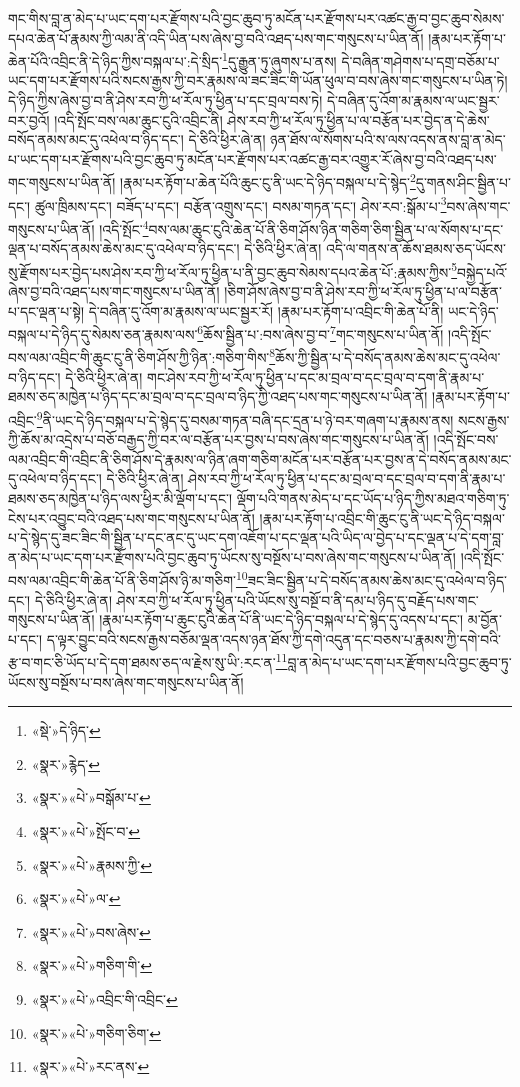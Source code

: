 གང་གིས་བླ་ན་མེད་པ་ཡང་དག་པར་རྫོགས་པའི་བྱང་ཆུབ་ཏུ་མངོན་པར་རྫོགས་པར་འཚང་རྒྱ་བ་བྱང་ཆུབ་སེམས་དཔའ་ཆེན་པོ་རྣམས་ཀྱི་ལམ་ནི་འདི་ཡིན་པས་ཞེས་བྱ་བའི་འཐད་པས་གང་གསུངས་པ་ཡིན་ནོ། །རྣམ་པར་རྟོག་པ་ཆེན་པོའི་འབྲིང་ནི་དེ་ཉིད་ཀྱིས་བསྐལ་པ་:དེ་སྲིད་\footnote{«སྡེ་»དེ་ཉིད་}དུ་རྒྱུན་ཏུ་ཞུགས་པ་ནས། དེ་བཞིན་གཤེགས་པ་དགྲ་བཅོམ་པ་ཡང་དག་པར་རྫོགས་པའི་སངས་རྒྱས་ཀྱི་བར་རྣམས་ལ་ཟང་ཟིང་གི་ཡོན་ཕུལ་བ་བས་ཞེས་གང་གསུངས་པ་ཡིན་ཏེ། དེ་ཉིད་ཀྱིས་ཞེས་བྱ་བ་ནི་ཤེས་རབ་ཀྱི་ཕ་རོལ་ཏུ་ཕྱིན་པ་དང་བྲལ་བས་ཏེ། དེ་བཞིན་དུ་འོག་མ་རྣམས་ལ་ཡང་སྦྱར་བར་བྱའོ། །འདི་སྤོང་བས་ལམ་ཆུང་ངུའི་འབྲིང་ནི། ཤེས་རབ་ཀྱི་ཕ་རོལ་ཏུ་ཕྱིན་པ་ལ་བརྩོན་པར་བྱེད་ན་དེ་ཆེས་བསོད་ནམས་མང་དུ་འཕེལ་བ་ཉིད་དང་། དེ་ཅིའི་ཕྱིར་ཞེ་ན། ཉན་ཐོས་ལ་སོགས་པའི་ས་ལས་འདས་ནས་བླ་ན་མེད་པ་ཡང་དག་པར་རྫོགས་པའི་བྱང་ཆུབ་ཏུ་མངོན་པར་རྫོགས་པར་འཚང་རྒྱ་བར་འགྱུར་རོ་ཞེས་བྱ་བའི་འཐད་པས་གང་གསུངས་པ་ཡིན་ནོ། །རྣམ་པར་རྟོག་པ་ཆེན་པོའི་ཆུང་ངུ་ནི་ཡང་དེ་ཉིད་བསྐལ་པ་དེ་སྙེད་\footnote{«སྣར་»རྙེད་}དུ་གནས་ཤིང་སྦྱིན་པ་དང་། ཚུལ་ཁྲིམས་དང་། བཟོད་པ་དང་། བརྩོན་འགྲུས་དང་། བསམ་གཏན་དང་། ཤེས་རབ་:སྒོམ་པ་\footnote{«སྣར་»«པེ་»བསྒོམ་པ་}བས་ཞེས་གང་གསུངས་པ་ཡིན་ནོ། །འདི་སྤོང་\footnote{«སྣར་»«པེ་»སྤོང་བ་}བས་ལམ་ཆུང་ངུའི་ཆེན་པོ་ནི་ཅིག་ཤོས་ཉིན་གཅིག་ཅིག་སྦྱིན་པ་ལ་སོགས་པ་དང་ལྡན་པ་བསོད་ནམས་ཆེས་མང་དུ་འཕེལ་བ་ཉིད་དང་། དེ་ཅིའི་ཕྱིར་ཞེ་ན། འདི་ལ་གནས་ན་ཆོས་ཐམས་ཅད་ཡོངས་སུ་རྫོགས་པར་བྱེད་པས་ཤེས་རབ་ཀྱི་ཕ་རོལ་ཏུ་ཕྱིན་པ་ནི་བྱང་ཆུབ་སེམས་དཔའ་ཆེན་པོ་:རྣམས་ཀྱིས་\footnote{«སྣར་»«པེ་»རྣམས་ཀྱི་}བསྐྱེད་པའོ་ཞེས་བྱ་བའི་འཐད་པས་གང་གསུངས་པ་ཡིན་ནོ། །ཅིག་ཤོས་ཞེས་བྱ་བ་ནི་ཤེས་རབ་ཀྱི་ཕ་རོལ་ཏུ་ཕྱིན་པ་ལ་བརྩོན་པ་དང་ལྡན་པ་སྟེ། དེ་བཞིན་དུ་འོག་མ་རྣམས་ལ་ཡང་སྦྱར་རོ། །རྣམ་པར་རྟོག་པ་འབྲིང་གི་ཆེན་པོ་ནི། ཡང་དེ་ཉིད་བསྐལ་པ་དེ་ཉིད་དུ་སེམས་ཅན་རྣམས་ལས་\footnote{«སྣར་»«པེ་»ལ་}ཆོས་སྦྱིན་པ་:བས་ཞེས་བྱ་བ་\footnote{«སྣར་»«པེ་»བས་ཞེས་}གང་གསུངས་པ་ཡིན་ནོ། །འདི་སྤོང་བས་ལམ་འབྲིང་གི་ཆུང་ངུ་ནི་ཅིག་ཤོས་ཀྱི་ཉིན་:གཅིག་གིས་\footnote{«སྣར་»«པེ་»གཅིག་གི་}ཆོས་ཀྱི་སྦྱིན་པ་དེ་བསོད་ནམས་ཆེས་མང་དུ་འཕེལ་བ་ཉིད་དང་། དེ་ཅིའི་ཕྱིར་ཞེ་ན། གང་ཤེས་རབ་ཀྱི་ཕ་རོལ་ཏུ་ཕྱིན་པ་དང་མ་བྲལ་བ་དང་བྲལ་བ་དག་ནི་རྣམ་པ་ཐམས་ཅད་མཁྱེན་པ་ཉིད་དང་མ་བྲལ་བ་དང་བྲལ་བ་ཉིད་ཀྱི་འཐད་པས་གང་གསུངས་པ་ཡིན་ནོ། །རྣམ་པར་རྟོག་པ་འབྲིང་\footnote{«སྣར་»«པེ་»འབྲིང་གི་འབྲིང་}ནི་ཡང་དེ་ཉིད་བསྐལ་པ་དེ་སྙེད་དུ་བསམ་གཏན་བཞི་དང་དྲན་པ་ཉེ་བར་གཞག་པ་རྣམས་ནས། སངས་རྒྱས་ཀྱི་ཆོས་མ་འདྲེས་པ་བཅོ་བརྒྱད་ཀྱི་བར་ལ་བརྩོན་པར་བྱས་པ་བས་ཞེས་གང་གསུངས་པ་ཡིན་ནོ། །འདི་སྤོང་བས་ལམ་འབྲིང་གི་འབྲིང་ནི་ཅིག་ཤོས་དེ་རྣམས་ལ་ཉིན་ཞག་གཅིག་མངོན་པར་བརྩོན་པར་བྱས་ན་དེ་བསོད་ནམས་མང་དུ་འཕེལ་བ་ཉིད་དང་། དེ་ཅིའི་ཕྱིར་ཞེ་ན། ཤེས་རབ་ཀྱི་ཕ་རོལ་ཏུ་ཕྱིན་པ་དང་མ་བྲལ་བ་དང་བྲལ་བ་དག་ནི་རྣམ་པ་ཐམས་ཅད་མཁྱེན་པ་ཉིད་ལས་ཕྱིར་མི་ལྡོག་པ་དང་། ལྡོག་པའི་གནས་མེད་པ་དང་ཡོད་པ་ཉིད་ཀྱིས་མཐའ་གཅིག་ཏུ་ངེས་པར་འབྱུང་བའི་འཐད་པས་གང་གསུངས་པ་ཡིན་ནོ། །རྣམ་པར་རྟོག་པ་འབྲིང་གི་ཆུང་ངུ་ནི་ཡང་དེ་ཉིད་བསྐལ་པ་དེ་སྙེད་དུ་ཟང་ཟིང་གི་སྦྱིན་པ་དང་ནང་དུ་ཡང་དག་འཇོག་པ་དང་ལྡན་པའི་ཡིད་ལ་བྱེད་པ་དང་ལྡན་པ་དེ་དག་བླ་ན་མེད་པ་ཡང་དག་པར་རྫོགས་པའི་བྱང་ཆུབ་ཏུ་ཡོངས་སུ་བསྔོས་པ་བས་ཞེས་གང་གསུངས་པ་ཡིན་ནོ། །འདི་སྤོང་བས་ལམ་འབྲིང་གི་ཆེན་པོ་ནི་ཅིག་ཤོས་ཉི་མ་གཅིག་\footnote{«སྣར་»«པེ་»གཅིག་ཅིག་}ཟང་ཟིང་སྦྱིན་པ་དེ་བསོད་ནམས་ཆེས་མང་དུ་འཕེལ་བ་ཉིད་དང་། དེ་ཅིའི་ཕྱིར་ཞེ་ན། ཤེས་རབ་ཀྱི་ཕ་རོལ་ཏུ་ཕྱིན་པའི་ཡོངས་སུ་བསྔོ་བ་ནི་དམ་པ་ཉིད་དུ་བརྗོད་པས་གང་གསུངས་པ་ཡིན་ནོ། །རྣམ་པར་རྟོག་པ་ཆུང་ངུའི་ཆེན་པོ་ནི་ཡང་དེ་ཉིད་བསྐལ་པ་དེ་སྙེད་དུ་འདས་པ་དང་། མ་བྱོན་པ་དང་། ད་ལྟར་བྱུང་བའི་སངས་རྒྱས་བཅོམ་ལྡན་འདས་ཉན་ཐོས་ཀྱི་དགེ་འདུན་དང་བཅས་པ་རྣམས་ཀྱི་དགེ་བའི་རྩ་བ་གང་ཅི་ཡོད་པ་དེ་དག་ཐམས་ཅད་ལ་རྗེས་སུ་ཡི་:རང་ན་\footnote{«སྣར་»«པེ་»རང་ནས་}བླ་ན་མེད་པ་ཡང་དག་པར་རྫོགས་པའི་བྱང་ཆུབ་ཏུ་ཡོངས་སུ་བསྔོས་པ་བས་ཞེས་གང་གསུངས་པ་ཡིན་ནོ། 